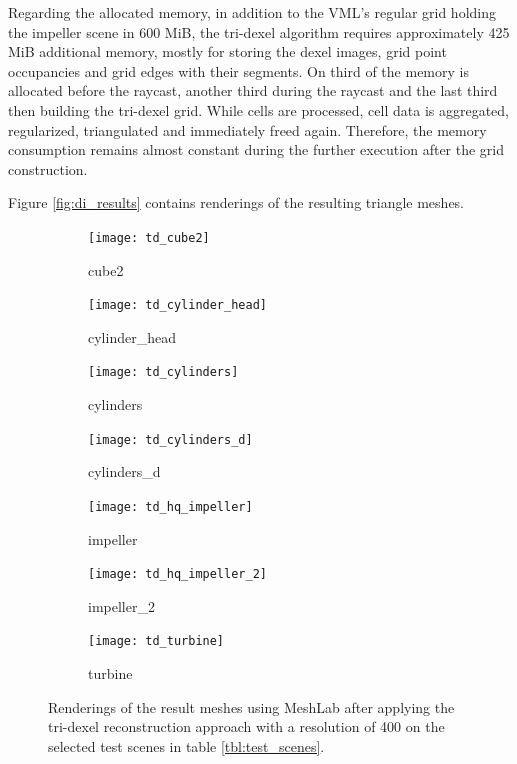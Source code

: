 %
Regarding the allocated memory, in addition to the VML's regular grid holding the impeller scene in 600 MiB, the tri-dexel algorithm requires approximately 425 MiB additional memory, mostly for storing the dexel images, grid point occupancies and grid edges with their segments.
On third of the memory is allocated before the raycast, another third during the raycast and the last third then building the tri-dexel grid.
While cells are processed, cell data is aggregated, regularized, triangulated and immediately freed again.
Therefore, the memory consumption remains almost constant during the further execution after the grid construction.

Figure \ref{fig:di_results} contains renderings of the resulting triangle meshes.
%
\begin{figure}
	\centering
	\begin{subfigure}[b]{0.34\textwidth}
		\centering
		\texttt{[image: td\_cube2]}
		\caption{cube2}
		\label{fig:td_cube2}
	\end{subfigure}
	\hspace{1cm}
	\begin{subfigure}[b]{0.34\textwidth}
		\centering
		\texttt{[image: td\_cylinder\_head]}
		\caption{cylinder\_head}
		\label{fig:td_cylinder_head}
	\end{subfigure}
	\begin{subfigure}[b]{0.34\textwidth}
		\centering
		\texttt{[image: td\_cylinders]}
		\caption{cylinders}
		\label{fig:td_cylinders}
	\end{subfigure}
	\hspace{1cm}
	\begin{subfigure}[b]{0.34\textwidth}
		\centering
		\texttt{[image: td\_cylinders\_d]}
		\caption{cylinders\_d}
		\label{fig:td_cylinders_delaunay}
	\end{subfigure}
	\begin{subfigure}[b]{0.34\textwidth}
		\centering
		\texttt{[image: td\_hq\_impeller]}
		\caption{impeller}
		\label{fig:td_hq_impeller}
	\end{subfigure}
	\hspace{1cm}
	\begin{subfigure}[b]{0.34\textwidth}
		\centering
		\texttt{[image: td\_hq\_impeller\_2]}
		\caption{impeller\_2}
		\label{fig:td_hq_impeller_2}
	\end{subfigure}
	\begin{subfigure}[b]{0.33\textwidth}
		\centering
		\texttt{[image: td\_turbine]}
		\caption{turbine}
		\label{fig:td_turbine}
	\end{subfigure}
	\caption{
		Renderings of the result meshes using MeshLab after applying the tri-dexel reconstruction approach with a resolution of 400 on the selected test scenes in table \ref{tbl:test_scenes}.
	}
	\label{fig:td_results}
\end{figure}
